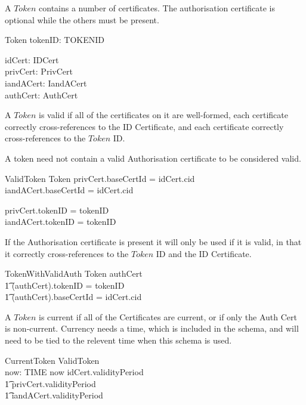 A $Token$ contains a number of certificates. The
authorisation certificate is optional while the others must be present.
\begin{schema}{Token}
	tokenID: TOKENID

\also	idCert: IDCert
\\	privCert: PrivCert
\\	iandACert: IandACert
\\	authCert: \Optional AuthCert
\end{schema}


A $Token$ is valid if all of the certificates on it are well-formed,
each certificate correctly cross-references to the ID Certificate,
and each certificate correctly cross-references to the $Token$ ID.

A token need not contain a valid Authorisation certificate to be considered valid.

\begin{schema}{ValidToken}
	Token
\where
	privCert.baseCertId = idCert.cid
\\	iandACert.baseCertId = idCert.cid

\also	privCert.tokenID = tokenID
\\	iandACert.tokenID = tokenID
\end{schema}

If the Authorisation certificate is present it will only be used if it
is valid, in that it correctly cross-references to the $Token$ ID and
the ID Certificate.

\begin{schema}{TokenWithValidAuth}
	Token
\where
        authCert \neq \Nil 
\\      \t1    \land  (\The authCert).tokenID = tokenID
\\	\t1    \land  (\The authCert).baseCertId = idCert.cid
\end{schema}

A $Token$ is current if all of the Certificates are current,
or if only the Auth Cert is non-current.
Currency needs a time, which is included in the schema,
and will need to be tied to the relevent time when this schema is used.

\begin{schema}{CurrentToken}
	ValidToken
\\	now: TIME
\where
	now \in idCert.validityPeriod
\\ \t1		{} \cap privCert.validityPeriod
\\ \t1		{} \cap iandACert.validityPeriod
\end{schema}

